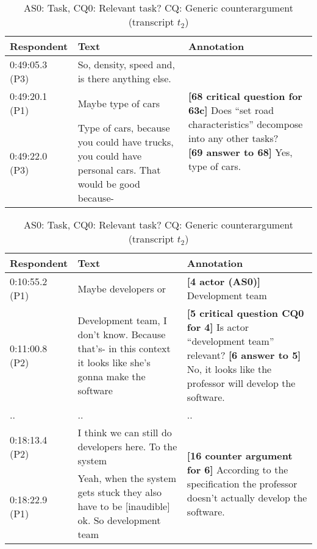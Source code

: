 \begin{table}[!htbp]
\begin{tabular}{|p{20mm}|p{80mm}|p{50mm}|}
\hline
Respondent & Text & Annotation\\
\hline
0:49:05.3 (P3)&So, density, speed and, is there anything else.&\multirow{3}{50mm}{\textbf{[68 critical question for 63c]} Does ``set road characteristics'' decompose into any other tasks?\newline
\textbf{[69 answer to 68]} Yes, type of cars.}\\
\cline{1-2}
0:49:20.1 (P1) & Maybe type of cars&\\	
\cline{1-2}
0:49:22.0 (P3) & Type of cars, because you could have trucks, you could have personal cars. That would be good because-&\\
\hline	
\end{tabular}
\caption{CQ: Does a task decompose into other tasks? (transcript $t_2$)}
\label{table:transcript:cq:task_decomp}

\begin{tabular}{|p{20mm}|p{60mm}|p{70mm}|}
\hline
Respondent & Text & Annotation\\
\hline

0:10:55.2 (P1) & Maybe developers or & \textbf{[4 actor (AS0)]} Development team\\
\hline
0:11:00.8 (P2)&Development team, I don't know. Because that's- in this context it looks like she's gonna make the software&\textbf{[5 critical question CQ0 for 4]} Is actor ``development team'' relevant?\newline
\textbf{[6 answer to 5]} No, it looks like the professor will develop the software.\\
\hline
..&..&..\\
\hline
0:18:13.4 (P2) & I think we can still do developers here. To the system & \multirow{2}{70mm}{\textbf{[16 counter argument for 6]} According to the specification the professor doesn't actually develop the software.}\\
\cline{1-2}
0:18:22.9 (P1)&Yeah, when the system gets stuck they also have to be [inaudible] ok. So development team&\\	
\hline	
\end{tabular}
\caption{AS0: Task, CQ0: Relevant task? CQ: Generic counterargument (transcript $t_2$)}
\label{table:transcript:as0-cq0-cq_counterarg}
\end{table}
\fi